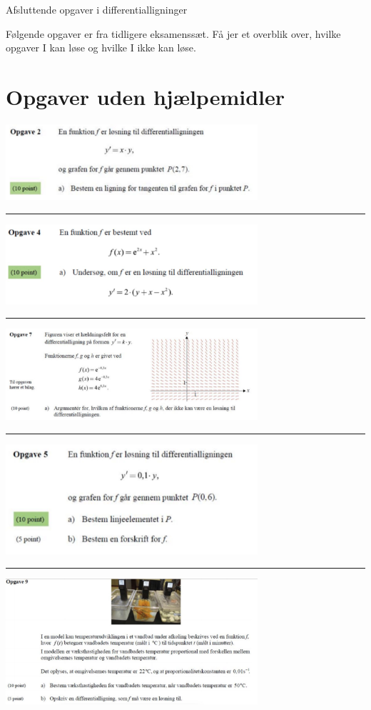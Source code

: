 \begin{center}
	\Huge
	Afsluttende opgaver i differentialligninger
\end{center}

Følgende opgaver er fra tidligere eksamenssæt. Få jer et overblik over, hvilke opgaver I kan løse og hvilke I ikke kan løse. 
\section*{Opgaver uden hjælpemidler}
\begin{center}
	\includegraphics[width=0.7\textwidth]{Billeder/opg1.jpg}
	\hrule
	\includegraphics[width=0.7\textwidth]{Billeder/opg2.jpg}
	\hrule
	\includegraphics[width=0.7\textwidth]{Billeder/opg3.jpg}
	\hrule
	\includegraphics[width=0.7\textwidth]{Billeder/opg4.jpg}
	\hrule
	\includegraphics[width=0.7\textwidth]{Billeder/opg5.jpg}

\end{center}

